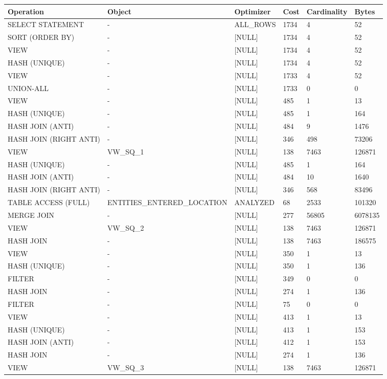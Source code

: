 \documentclass[11pt]{article}
\numberwithin{figure}{subsection}
\begin{document}
		\begin{tabularx}{\textwidth}{|X|X|X|X|X|X|}
Operation&Object&Optimizer&Cost&Cardinality&Bytes\\ \hline
SELECT STATEMENT& - &ALL\_ROWS&1734&4&52\\ \hline
SORT (ORDER BY)& - &[NULL]&1734&4&52\\ \hline
VIEW& - &[NULL]&1734&4&52\\ \hline
HASH (UNIQUE)& - &[NULL]&1734&4&52\\ \hline
VIEW& - &[NULL]&1733&4&52\\ \hline
UNION-ALL& - &[NULL]&1733&0&0\\ \hline
VIEW& - &[NULL]&485&1&13\\ \hline
HASH (UNIQUE)& - &[NULL]&485&1&164\\ \hline
HASH JOIN (ANTI)& - &[NULL]&484&9&1476\\ \hline
HASH JOIN (RIGHT ANTI)& - &[NULL]&346&498&73206\\ \hline
VIEW&VW\_SQ\_1&[NULL]&138&7463&126871\\ \hline
HASH (UNIQUE)& - &[NULL]&485&1&164\\ \hline
HASH JOIN (ANTI)& - &[NULL]&484&10&1640\\ \hline
HASH JOIN (RIGHT ANTI)& - &[NULL]&346&568&83496\\ \hline
TABLE ACCESS (FULL)&ENTITIES\_ENTERED\_LOCATION&ANALYZED&68&2533&101320\\ \hline
MERGE JOIN& - &[NULL]&277&56805&6078135\\ \hline
VIEW&VW\_SQ\_2&[NULL]&138&7463&126871\\ \hline
HASH JOIN& - &[NULL]&138&7463&186575\\ \hline
VIEW& - &[NULL]&350&1&13\\ \hline
HASH (UNIQUE)& - &[NULL]&350&1&136\\ \hline
FILTER& - &[NULL]&349&0&0\\ \hline
HASH JOIN& - &[NULL]&274&1&136\\ \hline
FILTER& - &[NULL]&75&0&0\\ \hline
VIEW& - &[NULL]&413&1&13\\ \hline
HASH (UNIQUE)& - &[NULL]&413&1&153\\ \hline
HASH JOIN (ANTI)& - &[NULL]&412&1&153\\ \hline
HASH JOIN& - &[NULL]&274&1&136\\ \hline
VIEW&VW\_SQ\_3&[NULL]&138&7463&126871\\ \hline
		\end{tabularx}
		
\end{document}
